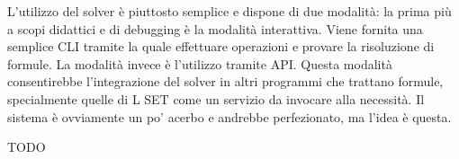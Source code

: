 \documentclass[11pt]{article}
\begin{document}
L'utilizzo del solver è piuttosto semplice e dispone di due modalità:
la prima più a scopi didattici e di debugging è la modalità
interattiva. Viene fornita una semplice CLI tramite la quale
effettuare operazioni e provare la risoluzione di formule. La modalità
invece è l'utilizzo tramite API. Questa modalità consentirebbe
l'integrazione del solver in altri programmi che trattano formule,
specialmente quelle di L SET come un servizio da invocare alla
necessità. Il sistema è ovviamente un po' acerbo e andrebbe
perfezionato, ma l'idea è questa.

TODO
\end{document}
